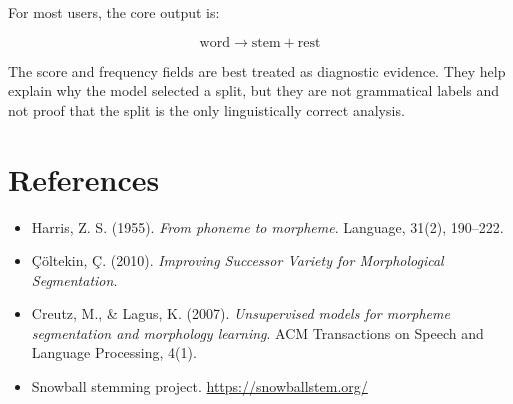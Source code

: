 \documentclass[11pt]{article}
\begin{document}
For most users, the core output is:

\[
\text{word} \rightarrow \text{stem} + \text{rest}
\]

The score and frequency fields are best treated as diagnostic evidence. They
help explain why the model selected a split, but they are not grammatical labels
and not proof that the split is the only linguistically correct analysis.

\section*{References}

\begin{itemize}
  \item Harris, Z. S. (1955). \textit{From phoneme to morpheme}. Language, 31(2),
  190--222.

  \item Çöltekin, Ç. (2010). \textit{Improving Successor Variety for Morphological
  Segmentation}.

  \item Creutz, M., \& Lagus, K. (2007). \textit{Unsupervised models for morpheme
  segmentation and morphology learning}. ACM Transactions on Speech and
  Language Processing, 4(1).

  \item Snowball stemming project. \url{https://snowballstem.org/}
\end{itemize}
\end{document}

